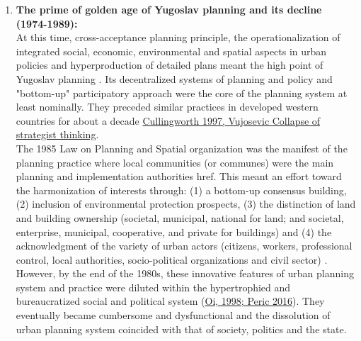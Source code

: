 \documentclass[11pt]{report}
\begin{document}
\begin{enumerate}
The decentralizing political and economic measures\footnote{Strengthening the role of the Federal units and semi-market economic system} contributed to the introduction of integrated and comprehensive planning in Yugoslav context. Its main achievements are:
(1) the administrative hierarchy  and the distribution of plans,
(2) interdisciplinary planning practice,
(3) increased public participation, and
(4) social approach through the mass provision of affordable housing \cite{Vesna Cagic 2014, Peric 2016}. This model was introduced as the ‘Basic Policy on Urbanism and Spatial Ordering’ and passed by the State Parliament in 1971 \href{}{\citealt{nedovicbudic_waves_2006}}.
Namely, Yugoslav planning system was internationally acknowledged as significantly decentralized and multidisciplinary with strong tendencies to include and balance spatial, social, economic, and environmental principles (\href{}{\citealt{simmie_self-management_1989}}; \href{}{\citealt{Miodrag Vujosevic, 2003}}, \href{}{\citealt{peric_evolution_2016}}).

\item \textbf{The prime of golden age of Yugoslav planning and its decline (1974-1989):}
\\
At this time, cross-acceptance planning principle, the operationalization of integrated social, economic, environmental and spatial aspects in urban policies and hyperproduction of detailed plans meant the high point of Yugoslav planning \cite{Mornings after Nedovic Budic}.
Its decentralized systems of planning and policy and "bottom-up" participatory approach were the core of the planning system at least nominally. They preceded similar practices in developed western countries for about a decade \href{}{Cullingworth 1997, Vujosevic Collapse of strategist thinking}.
\\

The 1985 Law on Planning and Spatial organization was the manifest of the planning practice where local communities (or communes) were the main planning and implementation authorities href{}{\citealt{vujosevic_planning_2006}}. This meant an effort toward the harmonization of interests through:
(1) a bottom-up consensus building,
(2) inclusion of environmental protection prospects,
(3) the distinction of land and building ownership (societal, municipal, national for land; and societal, enterprise, municipal, cooperative, and private for buildings) and
(4) the acknowledgment of the variety of urban actors (citizens, workers, professional control, local authorities, socio-political organizations and civil sector) \cite{adjustment of planning practice nedovic budic 2001}.
However, by the end of the 1980s, these innovative features of urban planning system and practice were diluted within the hypertrophied and bureaucratized social and political system (\href{}{Oi, 1998; Peric 2016}). They eventually became cumbersome and dysfunctional and the dissolution of urban planning system coincided with that of society, politics and the state.
\end{enumerate}
\end{document}
